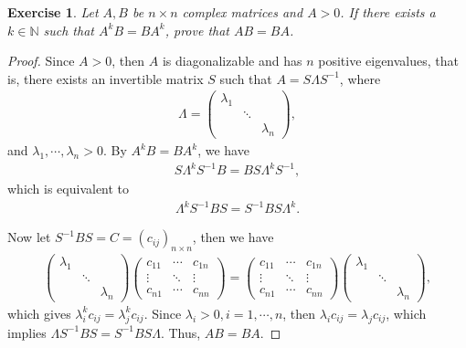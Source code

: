 \documentclass[11pt]{article}
\newtheorem{exercise}{Exercise}[section]
\theoremstyle{definition}
\numberwithin{equation}{subsection}
\begin{document}
\begin{exercise}
Let $A, B$ be $n \times n$ complex matrices and $A > 0$. If there exists a $k \in \mathbb{N}$ such that $A^kB = BA^k$, prove that $AB = BA$.
\end{exercise}
\begin{proof}
Since $A > 0$, then $A$ is diagonalizable and has $n$ positive eigenvalues, that is, there exists an invertible matrix $S$ such that $A = S \Lambda S^{-1}$, where 
\begin{align*}
    \Lambda = \begin{pmatrix}
        \lambda_1 & & \\
        & \ddots & \\
        & & \lambda_n
    \end{pmatrix},
\end{align*}
and $\lambda_1, \cdots, \lambda_n > 0$. By $A^kB = BA^k$, we have 
\begin{align*}
    S \Lambda^k S^{-1} B = B S \Lambda^k S^{-1},
\end{align*}
which is equivalent to 
\begin{align*}
    \Lambda^k S^{-1} B S = S^{-1} B S \Lambda^k.
\end{align*}

Now let $S^{-1} B S = C = (c_{ij})_{n\times n}$, then we have
\begin{align*}
    \begin{pmatrix}
        \lambda_1 & & \\
        & \ddots & \\
        & & \lambda_n
    \end{pmatrix} \begin{pmatrix}
        c_{11} & \cdots & c_{1n} \\
        \vdots & \ddots & \vdots \\
        c_{n1} & \cdots & c_{nn}
    \end{pmatrix} = \begin{pmatrix}
        c_{11} & \cdots & c_{1n} \\
        \vdots & \ddots & \vdots \\
        c_{n1} & \cdots & c_{nn}
    \end{pmatrix} \begin{pmatrix}
        \lambda_1 & & \\
        & \ddots & \\
        & & \lambda_n
    \end{pmatrix},
\end{align*}
which gives $\lambda_i^k c_{ij} = \lambda_j^k c_{ij}$. Since $\lambda_i > 0, i = 1, \cdots, n$, then $\lambda_i c_{ij} = \lambda_j c_{ij}$, which implies $\Lambda S^{-1} B S = S^{-1} B S \Lambda$. Thus, $AB = BA$.
\end{proof}
\end{document}

